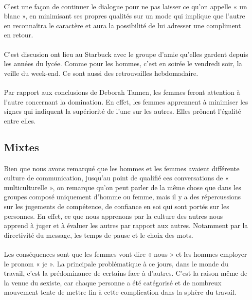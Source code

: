 \paragraph{} C'est une façon de continuer le dialogue pour ne pas laisser ce
qu'on appelle « un blanc », en minimisant ses propres qualités sur un mode qui
implique que l'autre en reconnaîtra le caractère et aura la possibilité de lui
adresser une compliment en retour.

\paragraph{} C'est discusion ont lieu au Starbuck avec le groupe d'amie
qu'elles gardent depuis les années du lycée.  Comme pour les hommes, c'est en
soirée le vendredi soir, la veille du week-end. Ce sont aussi des retrouvailles
hebdomadaire.

\paragraph{} Par rapport aux conclusions de Deborah Tannen, les femmes feront
attention à l'autre concernant la domination. En effet, les femmes apprennent à
minimiser les signes qui indiquent la supériorité de l'une sur les autres.
Elles prônent l'égalité entre elles.

\subsection{Mixtes}

\paragraph{} Bien que nous avons remarqué que les hommes et
les femmes avaient différente culture de communication, jusqu'au point de
qualifié ces conversations de « multiculturelle », on remarque qu'on peut
parler de la même chose que dans les groupes composé uniquement d'homme ou
femme, mais il y a des répercussions sur les jugements de compétence, de
confiance en soi qui sont portés sur les personnes. En effet, ce que nous
apprenons par la culture des autres nous apprend à juger et à évaluer les
autres par rapport aux autres.  Notamment par la directivité du message, les
temps de pause et le choix des mots.

\paragraph{} Les conséquences sont que les femmes vont dire « nous » et les
hommes employer le pronom « je ». La principale problématique à ce jours, dans
le monde du travail, c'est la prédominance de certains face à d'autres. C'est
la raison même de la venue du sexiste, car chaque personne a été catégorisé et
de nombreux mouvement tente de mettre fin à cette complication dans la sphère
du travail.


